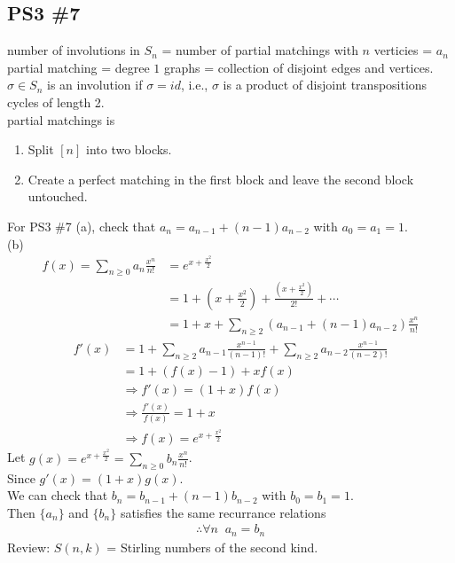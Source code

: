\documentclass{article}
\theoremstyle{definition}
\begin{document}
\subsection*{PS3 \#7}
number of involutions in $S_n$ = number of partial matchings with $n$ verticies
= $a_n$ \\ 
partial matching = degree $1$ graphs = collection of disjoint edges and vertices. \\ 
$\sigma \in S_n$ is an involution if $\sigma = id$, i.e., $\sigma$ is a
product of disjoint transpositions cycles of length 2. \\ 
partial matchings is 
\begin{enumerate}
    \item Split $[n]$ into two blocks.
    \item Create a perfect matching in the first block and leave
    the second block untouched.
\end{enumerate}
For PS3 \#7 (a), check that $a_n = a_{n-1} + (n-1) a_{n-2}$ 
with $a_0 = a_1 =1$. \\ 
(b) 
\begin{align*}
    f(x) = \sum_{n\ge 0} a_n \frac{x^n}{n!} &= e^{x + \frac{x^2}{2}} \\
    &= 1 + (x + \frac{x^2}{2}) + \frac{\left(x+\frac{x^2}{2}\right)}{2!} + \cdots \\ 
    &= 1+ x + \sum_{n\ge 2} (a_{n-1} + (n-1)a_{n-2}) \frac{x^n}{n!}
\end{align*}
\begin{align*}
    f'(x) &= 1 + \sum_{n\ge 2} a_{n-1} \frac{x^{n-1}}{(n-1)!} 
    + \sum_{n \ge 2} a_{n-2} \frac{x^{n-1}}{(n-2)!} \\ 
    &= 1 + (f(x) - 1) + xf(x) \\
    &\Rightarrow f'(x) = (1+x)f(x) \\ 
    &\Rightarrow \frac{f'(x)}{f(x)} = 1 + x \\ 
    &\Rightarrow f(x) = e^{x + \frac{x^2}{2}}
\end{align*}
Let $g(x) = e^{x + \frac{x^2}{2}} = \sum_{n\ge 0} b_n \frac{x^n}{n!}$. \\ 
Since $g'(x) = (1+x) g(x)$. \\ 
We can check that $b_n = b_{n-1} + (n-1)b_{n-2}$ with $b_0 = b_1 = 1$. \\
Then $\{a_n\}$ and $\{b_n\}$ satisfies the same recurrance relations 
\begin{align*}
    \therefore  \forall n \;\; a_n = b_n
\end{align*}
Review: $S(n,k)$ = Stirling numbers of the second kind. \\ 
\end{document}
